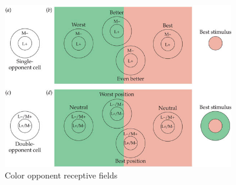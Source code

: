 \documentclass[a4paper,12pt,titlepage, oneside]{article}
\begin{document}
\begin{figure}[h!]
        \centering
        \includegraphics[width=0.9\textwidth]{opp_cells}
        \caption{Color opponent receptive fields \cite{SPCbook}}
\label{opp_cells}
\end{figure}
\end{document}
